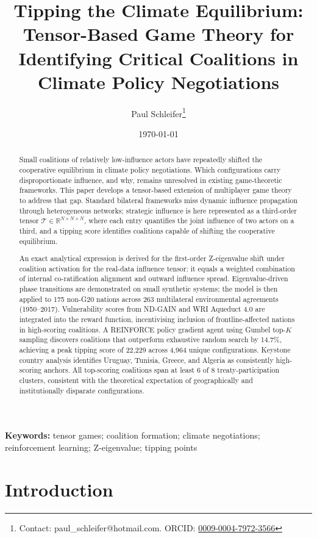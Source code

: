 \documentclass[11pt]{article}
\title{\textbf{Tipping the Climate Equilibrium: Tensor-Based Game Theory for Identifying Critical Coalitions in Climate Policy Negotiations}}
\author[1]{Paul Schleifer\thanks{Contact: paul_schleifer@hotmail.com. ORCID: \href{https://orcid.org/0009-0004-7972-3566}{0009-0004-7972-3566}}}
\affil[1]{Independent Researcher, London, United Kingdom}
\date{\today}
\newcommand{\keywords}[1]{\par\noindent\textbf{Keywords:} #1}
\begin{document}
\maketitle

\begin{abstract}
Small coalitions of relatively low-influence actors have repeatedly shifted the cooperative equilibrium in climate policy negotiations. Which configurations carry disproportionate influence, and why, remains unresolved in existing game-theoretic frameworks. This paper develops a tensor-based extension of multiplayer game theory to address that gap. Standard bilateral frameworks miss dynamic influence propagation through heterogeneous networks; strategic influence is here represented as a third-order tensor $\mathcal{T} \in \mathbb{R}^{N \times N \times N}$, where each entry quantifies the joint influence of two actors on a third, and a tipping score identifies coalitions capable of shifting the cooperative equilibrium.

An exact analytical expression is derived for the first-order Z-eigenvalue shift under coalition activation for the real-data influence tensor: it equals a weighted combination of internal co-ratification alignment and outward influence spread. Eigenvalue-driven phase transitions are demonstrated on small synthetic systems; the model is then applied to 175 non-G20 nations across 263 multilateral environmental agreements (1950--2017). Vulnerability scores from ND-GAIN and WRI Aqueduct 4.0 are integrated into the reward function, incentivising inclusion of frontline-affected nations in high-scoring coalitions. A REINFORCE policy gradient agent using Gumbel top-$K$ sampling discovers coalitions that outperform exhaustive random search by 14.7\%, achieving a peak tipping score of 22,229 across 4,964 unique configurations. Keystone country analysis identifies Uruguay, Tunisia, Greece, and Algeria as consistently high-scoring anchors. All top-scoring coalitions span at least 6 of 8 treaty-participation clusters, consistent with the theoretical expectation of geographically and institutionally disparate configurations.
\end{abstract}

\keywords{tensor games; coalition formation; climate negotiations; reinforcement learning; Z-eigenvalue; tipping points}

\section{Introduction}
\label{sec:intro}
\end{document}
